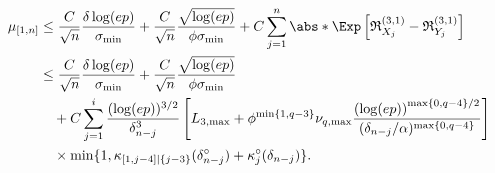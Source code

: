 \documentclass[aos]{imsart}
\begin{document}
\begin{equation*}
\begin{aligned}
    \mu_{[1,n]}
    & \leq\frac{C}{\sqrt{n}} \frac{\delta \log(ep)}{\sigma_{\min}} 
    + \frac{C}{\sqrt{n}} \frac{\sqrt{\log(ep)}}{\phi \sigma_{\min}}
    + C \sum_{j=1}^{n} \abs*{ \Exp\left[ \mathfrak{R}_{X_j}^{(3,1)} 
        - \mathfrak{R}_{Y_j}^{(3,1)} \right]} \\
    & \leq \frac{C}{\sqrt{n}} \frac{\delta \log(ep)}{\sigma_{\min}}  
    + \frac{C}{\sqrt{n}} \frac{\sqrt{\log(ep)}}{\phi \sigma_{\min}} \\
    & \quad + C \sum_{j=1}^i \frac{(\log(ep))^{3/2}}{\delta_{n-j}^3} \left[ 
        {L}_{3,\max} 
        + \phi^{\min\{1, q-3\}} \nu_{q,\max} \frac{ {(\log(ep))}^{\max\{0, q-4\}/2}}{(\delta_{n-j}/\alpha)^{\max\{0, q-4\}}}
    \right] \\
    & \quad \times \min\{ 1, \kappa_{[1,j-4]|\{j-3\}}(\delta_{n-j}^\circ) + \kappa^\circ_{j}(\delta_{n-j}) \}.
\end{aligned}
\end{equation*}

\end{document}
